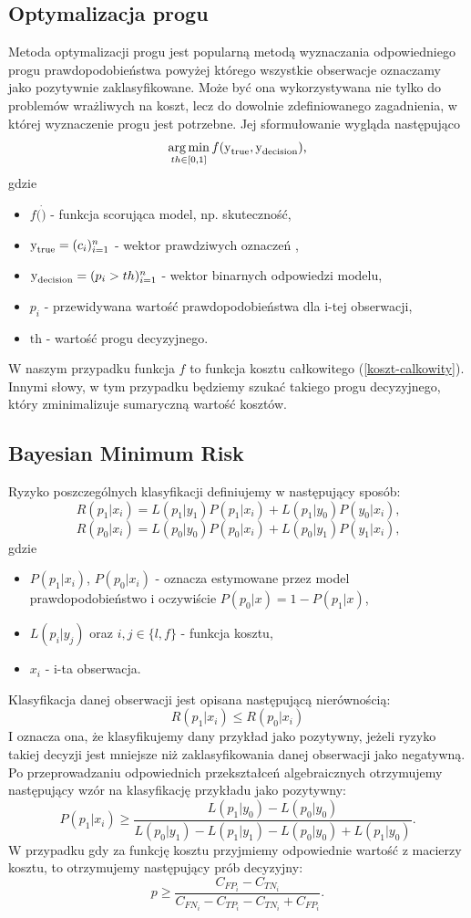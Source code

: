 \documentclass{book}
\DeclareMathOperator*{\argmin}{arg\,min}
\begin{document}
	\subsection{Optymalizacja progu}
		Metoda optymalizacji progu jest popularną metodą wyznaczania odpowiedniego progu prawdopodobieństwa powyżej którego wszystkie obserwacje oznaczamy jako pozytywnie zaklasyfikowane. Może być ona wykorzystywana nie tylko do problemów wrażliwych na koszt, lecz do dowolnie zdefiniowanego zagadnienia, w której wyznaczenie progu jest potrzebne. Jej sformułowanie wygląda następująco
		$$ \argmin_{th \in [0,1]} f(\ylab{y}{true}, \ylab{y}{decision}) \text{,} $$
		gdzie 
		\begin{itemize}
			\item $ f(\dot) $ - funkcja scorująca model, np. skuteczność,
			\item $ \text{y}_{\text{true}} = (c_i)_{i=1}^n $ - wektor prawdziwych oznaczeń ,
			\item $ \text{y}_{\text{decision}} = (p_i > th)_{i=1}^n $ - wektor binarnych odpowiedzi modelu,
			\item $ p_i $ - przewidywana wartość prawdopodobieństwa dla i-tej obserwacji,
			\item $ \text{th} $ - wartość progu decyzyjnego.
		\end{itemize}{}
		W naszym przypadku funkcja $f$ to funkcja kosztu całkowitego (\ref{koszt-calkowity}). Innymi słowy, w tym przypadku będziemy szukać takiego progu decyzyjnego, który zminimalizuje sumaryczną wartość kosztów.
		
	\subsection{Bayesian Minimum Risk}
	
	Ryzyko poszczególnych klasyfikacji definiujemy w następujący sposób:
	$$ R(p_1|x_i) = L(p_1|y_1)P(p_1|x_i) + L(p_1|y_0)P(y_0|x_i) \text{,}$$
	$$ R(p_0|x_i) = L(p_0|y_0)P(p_0|x_i) + L(p_0|y_1)P(y_1|x_i) \text{,}$$
	gdzie
	\begin{itemize}
		\item $P(p_1|x_i)$, $P(p_0|x_i)$ - oznacza estymowane przez model prawdopodobieństwo i oczywiście $P(p_0|x) = 1 - P(p_1|x)$,
		\item $L(p_{i}|y_{j})$ oraz $i,j \in \{l,f\}$ - funkcja kosztu,
		\item $x_i$ - i-ta obserwacja.
	\end{itemize}{}
	Klasyfikacja danej obserwacji jest opisana następującą nierównością:
	$$ R(p_1|x_i) \leq R(p_0|x_i)$$
	I oznacza ona, że klasyfikujemy dany przykład jako pozytywny, jeżeli ryzyko takiej decyzji jest mniejsze niż zaklasyfikowania danej obserwacji jako negatywną. 
	Po przeprowadzaniu odpowiednich przekształceń algebraicznych otrzymujemy następujący wzór na klasyfikację przykładu jako pozytywny:
	$$ P(p_1|x_i) \ge \frac{L(p_1|y_0) - L(p_0|y_0)}{L(p_0|y_1) - L(p_1|y_1) - L(p_0|y_0) + L(p_1|y_0)} \text{.}$$
	W przypadku gdy za funkcję kosztu przyjmiemy odpowiednie wartość z macierzy kosztu, to otrzymujemy następujący prób decyzyjny:
	$$ p \ge \frac{C_{FP_i} - C_{TN_i}}{C_{FN_i} - C_{TP_i} - C_{TN_i} + C_{FP_i}} \text{.}$$
\end{document}
